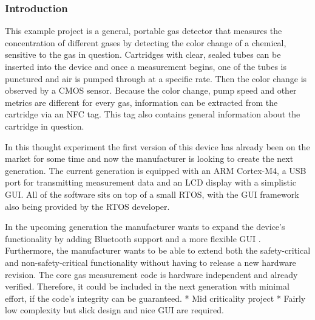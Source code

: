 \subsubsection{Introduction}
This example project is a general, portable gas detector that measures the concentration of different gases by detecting the color change of a chemical, sensitive to the gas in question. Cartridges with clear, sealed tubes can be inserted into the device and once a measurement begins, one of the tubes is punctured and air is pumped through at a specific rate. Then the color change is observed by a \gls{CMOS} sensor. Because the color change, pump speed and other metrics are different for every gas, information can be extracted from the cartridge via an \gls{NFC} tag. This tag also contains general information about the cartridge in question.

In this thought experiment the first version of this device has already been on the market for some time and now the manufacturer is looking to create the next generation. The current generation is equipped with an ARM Cortex-M4, a USB port for transmitting measurement data and an LCD display with a simplistic \gls{GUI}. All of the software sits on top of a small \gls{RTOS}, with the \gls{GUI} framework also being provided by the \gls{RTOS} developer.

In the upcoming generation the manufacturer wants to expand the device's functionality by adding Bluetooth support and a more flexible \gls{GUI} . Furthermore, the manufacturer wants to be able to extend both the safety-critical and non-safety-critical functionality without having to release a new hardware revision. The core gas measurement code is hardware independent and already verified. Therefore, it could be included in the next generation with minimal effort, if the code's integrity can be guaranteed.
* Mid criticality project
* Fairly low complexity but slick design and nice GUI are required.
